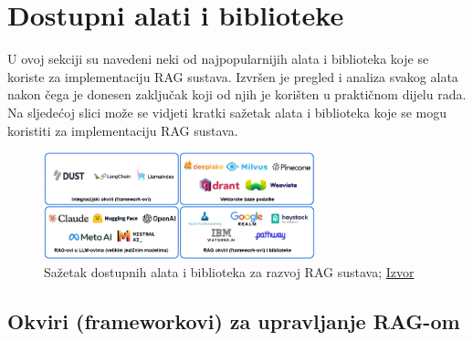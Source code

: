\documentclass[]{foi}
\begin{document}




\newpage
\section{Dostupni alati i biblioteke}

U ovoj sekciji su navedeni neki od najpopularnijih alata i biblioteka koje se koriste za implementaciju RAG sustava. 
Izvršen je pregled i analiza svakog alata nakon čega je donesen zaključak koji od njih je korišten u praktičnom dijelu rada.
Na sljedećoj slici može se vidjeti kratki sažetak alata i biblioteka koje se mogu koristiti za implementaciju RAG sustava.

\begin{figure}[h]
  \centering
  \includegraphics[width=0.7\textwidth]{./assets/sazetak_dostupni_alati.png}
  \caption{Sažetak dostupnih alata i biblioteka za razvoj RAG sustava; \href{https://tinyurl.com/eae6swbk}{Izvor}}
  \label{fig:slika9}
\end{figure}







\subsection{Okviri (frameworkovi) za upravljanje RAG-om}
\end{document}
